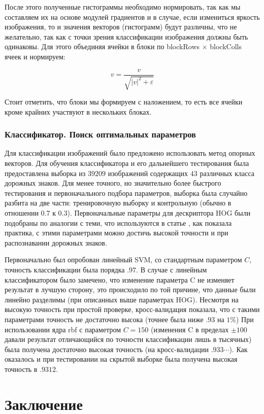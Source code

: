 \documentclass[12pt]{article}
\begin{document}
После этого полученные гистограммы необходимо нормировать, так как мы составляем их на основе модулей градиентов и в случае, если измениться яркость изображения, то и значения векторов (гистограмм) будут различны, что не желательно, так как с точки зрения классификации изображения должны быть одинаковы. Для этого объединяя ячейки в блоки по blockRows $\times$ blockColls ячеек и нормируем:

\[
v = \frac{v}{\sqrt{|v|^2 + \varepsilon}}
\]

Стоит отметить, что блоки мы формируем с наложением, то есть все ячейки кроме крайних участвуют в нескольких блоках.

\subsubsection*{Классификатор. Поиск оптимальных параметров}

Для классификации изображений было предложено использовать метод опорных векторов. Для обучения классификатора и его дальнейшего тестирования была предоставлена выборка из $39209$ изображений содержащих $43$ различных класса дорожных знаков. Для менее точного, но значительно более быстрого тестирования и первоначального подбора параметров, выборка была случайно разбита на две части: тренировочную выборку и контрольную (обычно в отношении $0.7$ к $0.3$). Первоначальные параметры для дескриптора HOG были подобраны по аналогии с теми, что используются в статье \cite{hog}, как показала практика, с этими параметрами можно достичь высокой точности и при распознавании дорожных знаков.

Первоначально был опробован линейный SVM, со стандартным параметром $C$, точность классификации была порядка $.97$. В случае с линейным классификатором было замечено, что изменение параметра C не изменяет результат в лучшую сторону, это происходило по той причине, что данные были линейно разделимы (при описанных выше параметрах HOG). Несмотря на высокую точность при простой проверке, кросс-валидация показала, что с такими параметрами точность не достаточно высока (точнее была ниже $.93$ на $1\%$) При использовании ядра rbf с параметром $C = 150$ (изменения C в пределах $\pm 100$ давали результат отличающийся по точности классификации лишь в тысячных) была получена достаточно высокая точность (на кросс-валидации $.933\cdots$). Как оказалось и при тестировании на скрытой выборке была получена высокая точность в $.9312$.

\section*{Заключение}
%
\end{document}
